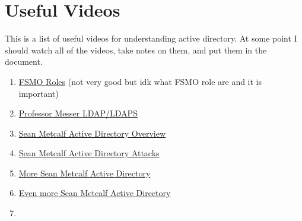 \documentclass{article}
\begin{document}
\section{Useful Videos}
This is a list of useful videos for understanding active directory.
At some point I should watch all of the videos, take notes on them, and put them in the document.
\begin{enumerate}
        \item \href{https://youtu.be/n5suPvKqo_Y}{FSMO Roles} (not very good but idk what FSMO role are and it is important)
        \item \href{https://youtu.be/5rEA7vRV3VE}{Professor Messer LDAP/LDAPS}
        \item \href{https://youtu.be/2w1cesS7pGY}{Sean Metcalf Active Directory Overview}
        \item \href{https://youtu.be/ze1UcSLOypw}{Sean Metcalf Active Directory Attacks}
        \item \href{https://youtu.be/Lz6haohGAMc}{More Sean Metcalf Active Directory}
        \item\href{https://youtu.be/b6GUXerE9Ac}{Even more Sean Metcalf Active Directory}
        \item 
\end{enumerate}
\end{document}
